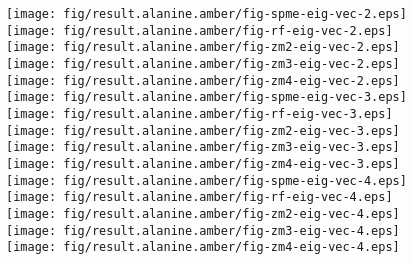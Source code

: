\documentclass[aip,jcp,a4paper,reprint,unsortedaddress,onecolumn,fleqn]{revtex4-1}
\begin{document}
\begin{figure}
  \centering
  \texttt{[image: fig/result.alanine.amber/fig-spme-eig-vec-2.eps]}
  \texttt{[image: fig/result.alanine.amber/fig-rf-eig-vec-2.eps]}
  \texttt{[image: fig/result.alanine.amber/fig-zm2-eig-vec-2.eps]}
  \texttt{[image: fig/result.alanine.amber/fig-zm3-eig-vec-2.eps]}
  \texttt{[image: fig/result.alanine.amber/fig-zm4-eig-vec-2.eps]}\\
  \texttt{[image: fig/result.alanine.amber/fig-spme-eig-vec-3.eps]}
  \texttt{[image: fig/result.alanine.amber/fig-rf-eig-vec-3.eps]}
  \texttt{[image: fig/result.alanine.amber/fig-zm2-eig-vec-3.eps]}
  \texttt{[image: fig/result.alanine.amber/fig-zm3-eig-vec-3.eps]}
  \texttt{[image: fig/result.alanine.amber/fig-zm4-eig-vec-3.eps]}\\
  \texttt{[image: fig/result.alanine.amber/fig-spme-eig-vec-4.eps]}
  \texttt{[image: fig/result.alanine.amber/fig-rf-eig-vec-4.eps]}
  \texttt{[image: fig/result.alanine.amber/fig-zm2-eig-vec-4.eps]}
  \texttt{[image: fig/result.alanine.amber/fig-zm3-eig-vec-4.eps]}
  \texttt{[image: fig/result.alanine.amber/fig-zm4-eig-vec-4.eps]}\\

\end{figure}
\end{document}
